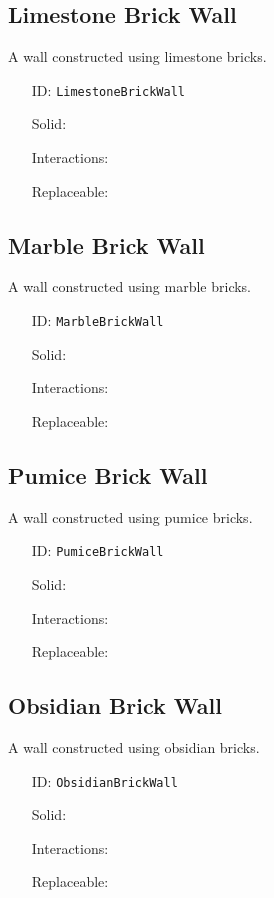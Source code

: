 \subsection{Limestone Brick Wall}\label{subsec:blocks_limestone brick wall}
A wall constructed using limestone bricks.
\newline
\begin{itemize}[nosep]
\item[ID:] \texttt{LimestoneBrickWall}
\item[Solid:]  \Checkmark \item[Interactions:]  \XSolidBrush \item[Replaceable:]  \XSolidBrush \end{itemize}

\subsection{Marble Brick Wall}\label{subsec:blocks_marble brick wall}
A wall constructed using marble bricks.
\newline
\begin{itemize}[nosep]
\item[ID:] \texttt{MarbleBrickWall}
\item[Solid:]  \Checkmark \item[Interactions:]  \XSolidBrush \item[Replaceable:]  \XSolidBrush \end{itemize}

\subsection{Pumice Brick Wall}\label{subsec:blocks_pumice brick wall}
A wall constructed using pumice bricks.
\newline
\begin{itemize}[nosep]
\item[ID:] \texttt{PumiceBrickWall}
\item[Solid:]  \Checkmark \item[Interactions:]  \XSolidBrush \item[Replaceable:]  \XSolidBrush \end{itemize}

\subsection{Obsidian Brick Wall}\label{subsec:blocks_obsidian brick wall}
A wall constructed using obsidian bricks.
\newline
\begin{itemize}[nosep]
\item[ID:] \texttt{ObsidianBrickWall}
\item[Solid:]  \Checkmark \item[Interactions:]  \XSolidBrush \item[Replaceable:]  \XSolidBrush \end{itemize}

